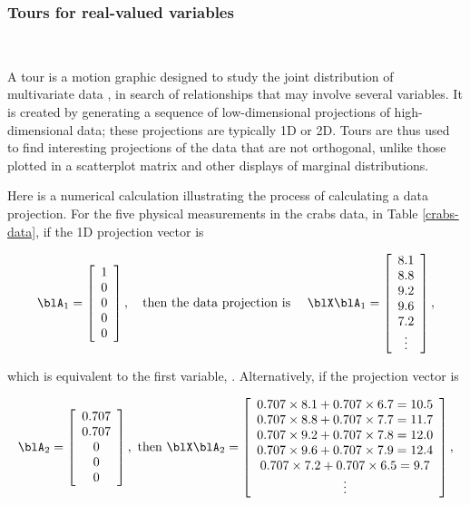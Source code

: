 \subsubsection{Tours for real-valued variables}~\label{tours}

A tour  is a motion graphic designed to study the joint
distribution of multivariate data \cite{As85}, in search of
relationships that may involve several variables. It is created by
generating a sequence of low-dimensional projections of
high-dimensional data; these projections are typically 1D or 2D.
Tours are thus used to find interesting projections of the data that
are not orthogonal, unlike those plotted in a scatterplot matrix and
other displays of marginal distributions.

Here is a numerical calculation illustrating the process of
calculating a data projection. For the five physical measurements in
the crabs data, in Table \ref{crabs-data}, if the 1D projection vector
is

\[
\blA_1 = \left[ \begin{array}{c} 1 \\ 0 \\ 0 \\ 0 \\ 0  \end{array} \right], 
~~~ \mbox{then the data projection is}~~~~ \blX\blA_1 = \left[ \begin{array}{c}  8.1 \\ 8.8 \\  9.2 \\ 9.6 \\ 7.2 \\  
   \vdots \end{array} \right],
\]


\noindent which is equivalent to the first variable, .
Alternatively, if the projection vector is

\[
\blA_2 = \left[ \begin{array}{c} 0.707 \\ 0.707 \\ 0 \\ 0 \\ 0  \end{array} \right], 
~ \mbox{then } \blX\blA_2 = \left[
\begin{array}{c} 0.707\times 8.1 + 0.707\times 6.7=10.5 \\ 0.707\times 8.8
+0.707\times 7.7=11.7 \\ 0.707\times 9.2 + 0.707\times 7.8=12.0 \\ 0.707\times
9.6 + 0.707\times 7.9=12.4\\ 0.707\times 7.2 + 0.707\times 6.5 =9.7\\
\vdots
\end{array} \right],
\]


